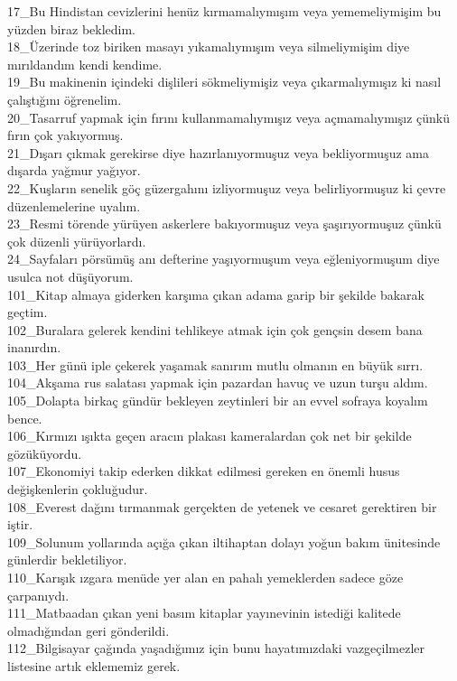 \begin{myparindent}{0pt}
17\_Bu Hindistan cevizlerini henüz kırmamalıymışım veya yememeliymişim bu yüzden biraz bekledim. \\
18\_Üzerinde toz biriken masayı yıkamalıymışım veya silmeliymişim diye mırıldandım kendi kendime. \\
19\_Bu makinenin içindeki dişlileri sökmeliymişiz veya çıkarmalıymışız ki nasıl çalıştığını öğrenelim. \\
20\_Tasarruf yapmak için fırını kullanmamalıymışız veya açmamalıymışız çünkü fırın çok yakıyormuş. \\
21\_Dışarı çıkmak gerekirse diye hazırlanıyormuşuz veya bekliyormuşuz ama dışarda yağmur yağıyor. \\
22\_Kuşların senelik göç güzergahını izliyormuşuz veya belirliyormuşuz ki çevre düzenlemelerine uyalım. \\
23\_Resmi törende yürüyen askerlere bakıyormuşuz veya şaşırıyormuşuz çünkü çok düzenli yürüyorlardı. \\
24\_Sayfaları pörsümüş anı defterine yaşıyormuşum veya eğleniyormuşum diye usulca not düşüyorum. \\
101\_Kitap almaya giderken karşıma çıkan adama garip bir şekilde bakarak geçtim. \\
102\_Buralara gelerek kendini tehlikeye atmak için çok gençsin desem bana inanırdın. \\
103\_Her günü iple çekerek yaşamak sanırım mutlu olmanın en büyük sırrı. \\
104\_Akşama rus salatası yapmak için pazardan havuç ve uzun turşu aldım. \\
105\_Dolapta birkaç gündür bekleyen zeytinleri bir an evvel sofraya koyalım bence. \\
106\_Kırmızı ışıkta geçen aracın plakası kameralardan çok net bir şekilde gözüküyordu. \\
107\_Ekonomiyi takip ederken dikkat edilmesi gereken en önemli husus değişkenlerin çokluğudur. \\
108\_Everest dağını tırmanmak gerçekten de yetenek ve cesaret gerektiren bir iştir. \\
109\_Solunum yollarında açığa çıkan iltihaptan dolayı yoğun bakım ünitesinde günlerdir bekletiliyor. \\
110\_Karışık ızgara menüde yer alan en pahalı yemeklerden sadece göze çarpanıydı. \\
111\_Matbaadan çıkan yeni basım kitaplar yayınevinin istediği kalitede olmadığından geri gönderildi. \\
112\_Bilgisayar çağında yaşadığımız için bunu hayatımızdaki vazgeçilmezler listesine artık eklememiz gerek. \\

\end{myparindent}
